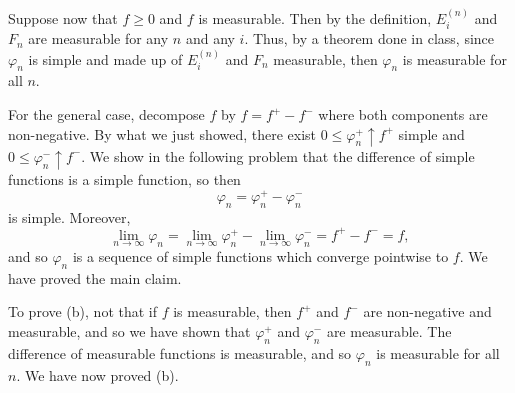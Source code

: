 \documentclass[11pt]{article}
\begin{document}
\begin{solution}
\begin{itemize}
Suppose now that $f\geq 0$ and $f$ is measurable. Then by the definition, $E_i^{(n)}$ and $F_n$ are measurable for any $n$ and any $i.$ Thus, by a theorem done in class, since $\varphi_n$ is simple and made up of $E_i^{(n)}$ and $F_n$ measurable, then $\varphi_n$ is measurable for all $n.$   
        
For the general case, decompose $f$ by $f = f^+ - f^-$ where both components are non-negative. By what we just showed, there exist $0 \leq \varphi_n^+ \uparrow f^+$ simple and $0 \leq \varphi_n^- \uparrow f^-.$ We show in the following problem that the difference of simple functions is a simple function, so then 
\[\varphi_n = \varphi_n^+ - \varphi_n^-\] is simple. Moreover, 
\[\lim_{n\to \infty} \varphi_n = \lim_{n\to \infty}\varphi_n^+ - \lim_{n\to \infty} \varphi_n^- = f^+ - f^- = f,\] and so $\varphi_n$ is a sequence of simple functions which converge pointwise to $f.$ We have proved the main claim. 

To prove (b), not that if $f$ is measurable, then $f^+$ and $f^-$ are non-negative and measurable, and so we have shown that $\varphi_n^+$ and $\varphi_n^-$ are measurable. The difference of measurable functions is measurable, and so $\varphi_n$ is measurable for all $n.$ We have now proved (b).
    \end{itemize}
\end{solution}




\newpage
\end{document}
